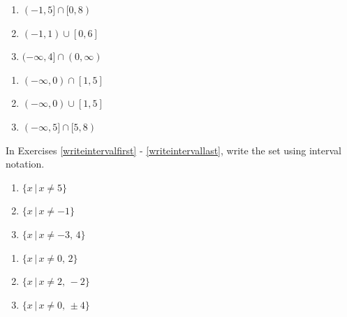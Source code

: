 \documentclass[11pt]{article}
\theoremstyle{definition}  %
\newcounter{HW}
\begin{document}
\begin{multicols}{3}
\begin{enumerate}
\setcounter{enumi}{\value{HW}}

\item  $(-1,5] \cap [0,8)$ \label{findunionintfirst}
\item  $(-1,1) \cup [0,6]$
\item $(-\infty,4]\cap (0,\infty)$

\setcounter{HW}{\value{enumi}}
\end{enumerate}
\end{multicols}

\begin{multicols}{3}
\begin{enumerate}
\setcounter{enumi}{\value{HW}}

\item $(-\infty,0) \cap [1,5]$
\item $(-\infty, 0) \cup [1,5]$
\item $(-\infty, 5] \cap [5,8)$ \label{findunionintlast}

\setcounter{HW}{\value{enumi}}
\end{enumerate}
\end{multicols}

In Exercises \ref{writeintervalfirst} - \ref{writeintervallast}, write the set using interval notation.   

\begin{multicols}{3}
\begin{enumerate}
\setcounter{enumi}{\value{HW}}

\item  $\{x\,|\, x \neq 5 \}$ \label{writeintervalfirst}
\item  $\{x\,|\, x \neq -1 \}$
\item  $\{x\,|\, x \neq -3,\, 4 \}$

\setcounter{HW}{\value{enumi}}
\end{enumerate}
\end{multicols}

\begin{multicols}{3}
\begin{enumerate}
\setcounter{enumi}{\value{HW}}

\item  $\{x\,|\, x \neq 0, \, 2 \}$
\item  $\{x\,|\, x \neq 2, \, -2 \}$
\item  $\{x\,|\, x \neq 0,\, \pm 4 \}$

\setcounter{HW}{\value{enumi}}
\end{enumerate}
\end{multicols}
\end{document}

